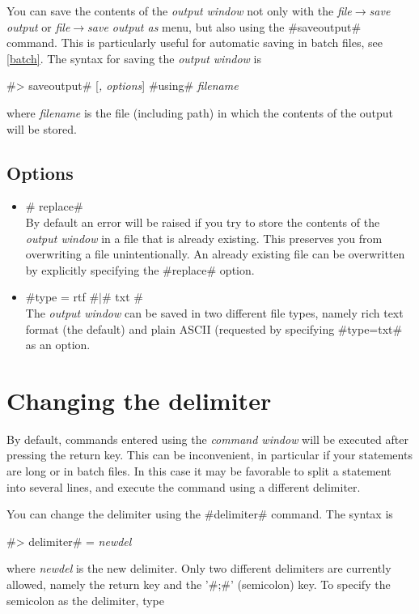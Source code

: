 You can save the contents of the {\em output window} not only with
the {\em file$\rightarrow$save output} or {\em
file$\rightarrow$save output as} menu, but also using the
#saveoutput# command. This is particularly useful for automatic
saving in batch files, see \autoref{batch}. The syntax for saving
the {\em output window} is

#> saveoutput# [{\em , options}] #using# {\em filename}

where {\em filename} is the file (including path) in which the
contents of the output will be stored.

\subsection*{Options}

\begin{itemize}
\item # replace# \\
By default an error will be raised if you try to store the
contents of the {\em output window} in a file that is already
existing. This preserves you from overwriting a file
unintentionally. An already existing file can be overwritten by
explicitly specifying the #replace# option.
\item #type = rtf #$|$# txt # \\
The {\em output window} can be saved in two different file types,
namely rich text format (the default) and plain ASCII (requested
by specifying #type=txt# as an option.
\end{itemize}

\section{Changing the delimiter}
\label{delimiter} 

By default, commands entered using the {\em command window} will
be executed after pressing the return key. This can be
inconvenient, in particular if your statements are long or in
batch files. In this case it may be favorable to split a statement
into several lines, and execute the command using a different
delimiter.

You can change the delimiter using the #delimiter# command. The
syntax is

#> delimiter# = {\em newdel}

where {\em newdel} is the new delimiter. Only two different
delimiters are currently allowed, namely the return key and the
'#;#' (semicolon) key. To specify the semicolon as the delimiter,
type


